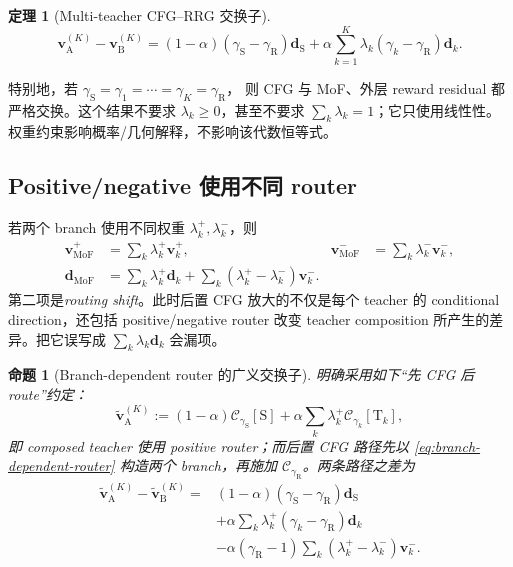 \documentclass[11pt,a4paper]{article}
\newcommand{\C}{\mathcal{C}}
\newcommand{\MoF}{\mathrm{MoF}}
\newcommand{\vfield}{\bm{v}}
\newcommand{\student}{\mathrm{S}}
\newcommand{\teacher}{\mathrm{T}}
\newcommand{\pos}{+}
\newcommand{\negbranch}{-}
\theoremstyle{definition}
\theoremstyle{plain}
\newtheorem{proposition}[definition]{命题}
\newtheorem{theorem}[definition]{定理}
\begin{document}
\begin{theorem}[Multi-teacher CFG--RRG 交换子]
\begin{equation}
\boxed{
  \vfield_{\mathrm A}^{(K)}-\vfield_{\mathrm B}^{(K)}
  =
  (1-\alpha)(\gamma_\student-\gamma_{\mathrm R})\bm d_\student
  +
  \alpha\sum_{k=1}^{K}
  \lambda_k(\gamma_k-\gamma_{\mathrm R})\bm d_k.
}
\label{eq:multi-commutator}
\end{equation}
\end{theorem}

特别地，若 $\gamma_\student=\gamma_1=\cdots=\gamma_K=\gamma_{\mathrm R}$，
则 CFG 与 MoF、外层 reward residual 都严格交换。这个结果不要求
$\lambda_k\ge0$，甚至不要求 $\sum_k\lambda_k=1$；它只使用线性性。
权重约束影响概率/几何解释，不影响该代数恒等式。

\subsection{Positive/negative 使用不同 router}

若两个 branch 使用不同权重 $\lambda_k^\pos,\lambda_k^\negbranch$，则
\begin{align}
  \vfield_{\MoF}^\pos
  &=
  \sum_k\lambda_k^\pos\vfield_k^\pos,
  &
  \vfield_{\MoF}^\negbranch
  &=
  \sum_k\lambda_k^\negbranch\vfield_k^\negbranch,
  \label{eq:branch-dependent-router}\\
  \bm d_{\MoF}
  &=
  \sum_k\lambda_k^\pos\bm d_k
  +
  \sum_k(\lambda_k^\pos-\lambda_k^\negbranch)
  \vfield_k^\negbranch.
  \label{eq:routing-shift}
\end{align}
第二项是\emph{routing shift}。此时后置 CFG 放大的不仅是每个 teacher 的
conditional direction，还包括 positive/negative router 改变 teacher composition
所产生的差异。把它误写成 $\sum_k\lambda_k\bm d_k$ 会漏项。

\begin{proposition}[Branch-dependent router 的广义交换子]
明确采用如下``先 CFG 后 route''约定：
\begin{equation}
  \widetilde{\vfield}_{\mathrm A}^{(K)}
  :=
  (1-\alpha)\C_{\gamma_\student}[\student]
  +\alpha\sum_k\lambda_k^\pos\C_{\gamma_k}[\teacher_k],
  \label{eq:branch-router-order-a}
\end{equation}
即 composed teacher 使用 positive router；而后置 CFG 路径先以
\eqref{eq:branch-dependent-router} 构造两个 branch，再施加
$\C_{\gamma_{\mathrm R}}$。两条路径之差为
\begin{equation}
\boxed{
\begin{aligned}
  \widetilde{\vfield}_{\mathrm A}^{(K)}
  -\widetilde{\vfield}_{\mathrm B}^{(K)}
  ={}&
  (1-\alpha)(\gamma_\student-\gamma_{\mathrm R})\bm d_\student\\
  &+\alpha\sum_k
  \lambda_k^\pos(\gamma_k-\gamma_{\mathrm R})\bm d_k\\
  &-\alpha(\gamma_{\mathrm R}-1)
  \sum_k(\lambda_k^\pos-\lambda_k^\negbranch)\vfield_k^\negbranch.
\end{aligned}
}
\label{eq:branch-router-commutator}
\end{equation}
\end{proposition}
\end{document}
